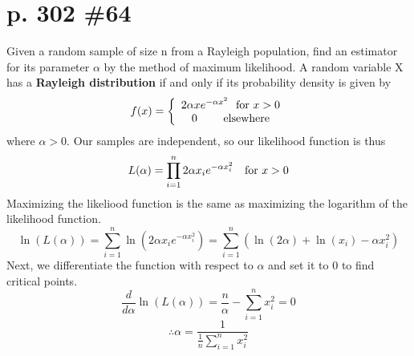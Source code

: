 \documentclass[12pt]{article}
\begin{document}
	\section[20pt]{p. 302 \#64}
	Given a random sample of size n from a Rayleigh population, find an estimator for its parameter \(\alpha\) by the method of maximum likelihood.
	\newline \newline
	A random variable X has a \textbf{Rayleigh distribution} if and only if its probability density is given by
	\[f(x)=\left\{\begin{array}{ccc}
	2\alpha xe^{-\alpha x^2}\ \  \textup{for } x>0\\0 \ \ \ \ \ \ \ \textup{elsewhere} \end{array}\right.\]
	where \(\alpha > 0\). \newline
	Our samples are independent, so our likelihood function is thus
	\[L(\alpha) = \prod_{i=1}^n2\alpha x_i e^{-\alpha x_i^2}\ \ \ \textup{for } x>0\]
	Maximizing the likeliood function is the same as maximizing the logarithm of the likelihood function.
	\[\ln(L(\alpha)) = \sum_{i=1}^n\ln(2\alpha x_i e^{-\alpha x_i^2})=\sum_{i=1}^n\left(\ln(2\alpha)+\ln(x_i)-\alpha x_i^2\right)\]
	Next, we differentiate the function with respect to \(\alpha\) and set it to 0 to find critical points.
	\[\frac{d}{d\alpha}\ln(L(\alpha)) = \frac{n}{\alpha}- \sum_{i=1}^nx_i^2=0\]
	\[\therefore \alpha = \frac{1}{\frac{1}{n}\sum_{i=1}^nx_i^2}\]
\end{document}
